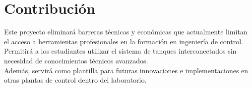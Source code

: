 \section{Contribución}

Este proyecto eliminará barreras técnicas y económicas que actualmente limitan el acceso a herramientas profesionales en la formación en ingeniería de control. Permitirá a los estudiantes utilizar el sistema de tanques interconectados sin necesidad de conocimientos técnicos avanzados.\\ 
Además, servirá como plantilla para futuras innovaciones e implementaciones en otras plantas de control dentro del laboratorio.